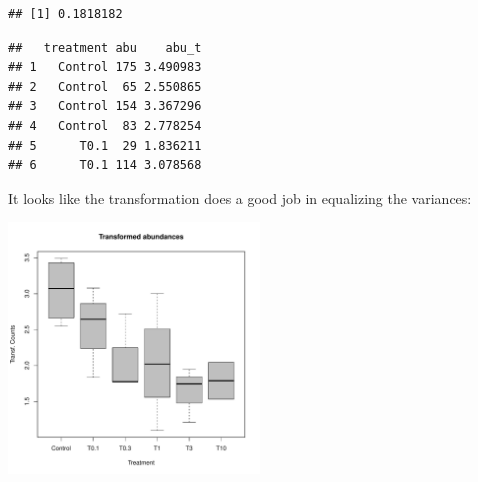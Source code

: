 \begin{knitrout}
\color{fgcolor}\begin{kframe}
\begin{alltt}
 \hlkwb{<-}  \hlopt{/} \hlopt{$}\hlstd{abu[dfm}\hlopt{$} \hlopt{!=} \hlstd{])}
\end{alltt}
\begin{verbatim}
## [1] 0.1818182
\end{verbatim}
\begin{alltt}
\hlopt{$} \hlkwb{<-}  \hlopt{*} \hlopt{$} \hlopt{+} \hlstd{)}
\end{alltt}
\begin{verbatim}
##   treatment abu    abu_t
## 1   Control 175 3.490983
## 2   Control  65 2.550865
## 3   Control 154 3.367296
## 4   Control  83 2.778254
## 5      T0.1  29 1.836211
## 6      T0.1 114 3.078568
\end{verbatim}
\end{kframe}
\end{knitrout}


It looks like the transformation does a good job in equalizing the variances:
\begin{knitrout}
\color{fgcolor}\begin{kframe}
\begin{alltt}
 \hlopt{~}   
         \hlstd{=} \hlstd{,}  \hlstd{=} \hlstd{,}
         \hlstd{=} \hlstd{,}  \hlstd{=} \hlstd{)}
\end{alltt}
\end{kframe}

{\centering \includegraphics[width=0.5\textwidth]{appendix/usetheglm/two/plot_count_trans-1} 

}



\end{knitrout}



